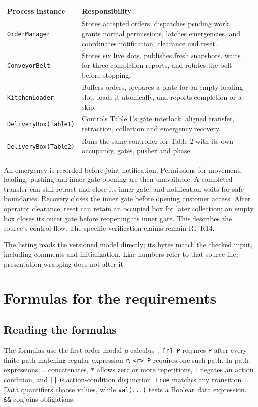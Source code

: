 \documentclass[11pt,a4paper]{article}
\begin{document}
\begin{tabularx}{\textwidth}{@{}p{}X@{}}
\toprule
Process instance & Responsibility \\
\midrule
\texttt{OrderManager} & Stores accepted orders, dispatches pending work, grants normal permissions, latches emergencies, and coordinates notification, clearance and reset. \\
\texttt{ConveyorBelt} & Stores six live slots, publishes fresh snapshots, waits for three completion reports, and rotates the belt before stopping. \\
\texttt{KitchenLoader} & Buffers orders, prepares a plate for an empty loading slot, loads it atomically, and reports completion or a skip. \\
\texttt{DeliveryBox(Table1)} & Controls Table 1's gate interlock, aligned transfer, retraction, collection and emergency recovery. \\
\texttt{DeliveryBox(Table2)} & Runs the same controller for Table 2 with its own occupancy, gates, pusher and phase. \\
\bottomrule
\end{tabularx}

An emergency is recorded before joint notification. Permissions for movement, loading, pushing and inner-gate opening are then unavailable. A completed transfer can still retract and close its inner gate, and notification waits for safe boundaries. Recovery closes the inner gate before opening customer access. After operator clearance, reset can retain an occupied box for later collection; an empty box closes its outer gate before reopening its inner gate. This describes the source's control flow. The specific verification claims remain R1--R14.

The listing reads the versioned model directly; its bytes match the checked input, including comments and initialization. Line numbers refer to that source file; presentation wrapping does not alter it.


\clearpage
\section{Formulas for the requirements}
\label{sec:formulas}
\subsection{Reading the formulas}
The formulas use the first-order modal $\mu$-calculus~\cite[Ch.~6]{book}. \texttt{[r] P} requires \texttt{P} after every finite path matching regular expression \texttt{r}; \texttt{<r> P} requires one such path. In path expressions, \texttt{.} concatenates, \texttt{*} allows zero or more repetitions, \texttt{!} negates an action condition, and \texttt{||} is action-condition disjunction. \texttt{true} matches any transition. Data quantifiers choose values, while \texttt{val(...)} tests a Boolean data expression. \texttt{\&\&} conjoins obligations.
\end{document}
